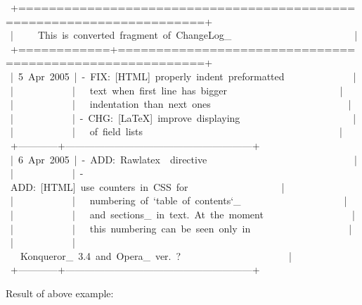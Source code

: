 \documentclass[12pt]{article}
\begin{document}
\begin{ttfamily}\begin{flushleft}
\mbox{~+======================================================================+}\\
\mbox{~|~~~~~This~is~converted~fragment~of~ChangeLog\_~~~~~~~~~~~~~~~~~~~~~~~~~|}\\
\mbox{~+============+=========================================================+}\\
\mbox{~|~5~Apr~2005~|~-~FIX:~[HTML]~properly~indent~preformatted~~~~~~~~~~~~~~|}\\
\mbox{~|~~~~~~~~~~~~|~~~text~when~first~line~has~bigger~~~~~~~~~~~~~~~~~~~~~~~|}\\
\mbox{~|~~~~~~~~~~~~|~~~indentation~than~next~ones~~~~~~~~~~~~~~~~~~~~~~~~~~~~|}\\
\mbox{~|~~~~~~~~~~~~|~-~CHG:~[\LaTeX{}]~improve~displaying~~~~~~~~~~~~~~~~~~~~~~~|}\\
\mbox{~|~~~~~~~~~~~~|~~~of~field~lists~~~~~~~~~~~~~~~~~~~~~~~~~~~~~~~~~~~~~~~~|}\\
\mbox{~+------------+---------------------------------------------------------+}\\
\mbox{~|~6~Apr~2005~|~-~ADD:~Rawlatex~~directive~~~~~~~~~~~~~~~~~~~~~~~~~~~~~~|}\\
\mbox{~|~~~~~~~~~~~~|~-~ADD:~[HTML]~use~counters~in~CSS~for~~~~~~~~~~~~~~~~~~~|}\\
\mbox{~|~~~~~~~~~~~~|~~~numbering~of~`table~of~contents`\_~~~~~~~~~~~~~~~~~~~~~|}\\
\mbox{~|~~~~~~~~~~~~|~~~and~sections\_~in~text.~At~the~moment~~~~~~~~~~~~~~~~~~|}\\
\mbox{~|~~~~~~~~~~~~|~~~this~numbering~can~be~seen~only~in~~~~~~~~~~~~~~~~~~~~|}\\
\mbox{~|~~~~~~~~~~~~|~~~Konqueror\_~3.4~and~Opera\_~ver.~?~~~~~~~~~~~~~~~~~~~~~~|}\\
\mbox{~+------------+---------------------------------------------------------+}\\
\end{flushleft}\end{ttfamily}

Result of above example:
\end{document}
